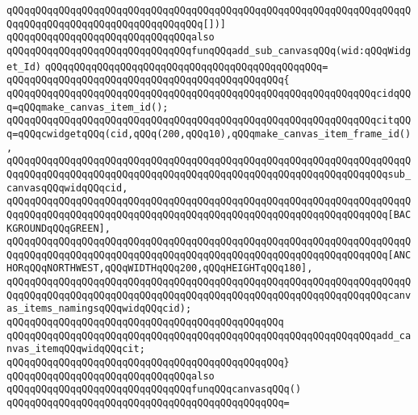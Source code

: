 \verb|qQQqqQQqqQQqqQQqqQQqqQQqqQQqqQQqqQQqqQQqqQQqqQQqqQQqqQQqqQQqqQQqqQQqqQQqqQQqqQQqqQQqqQQqqQQqqQQqqQQqqQQq[])]|\newline
\newline
\verb|qQQqqQQqqQQqqQQqqQQqqQQqqQQqqQQqalso|\newline
\verb|qQQqqQQqqQQqqQQqqQQqqQQqqQQqqQQqfunqQQqadd_sub_canvasqQQq(wid:qQQqWidget_Id)|\newline
\verb|qQQqqQQqqQQqqQQqqQQqqQQqqQQqqQQqqQQqqQQqqQQqqQQq=|\newline
\verb|qQQqqQQqqQQqqQQqqQQqqQQqqQQqqQQqqQQqqQQqqQQqqQQq{|\newline
\verb|qQQqqQQqqQQqqQQqqQQqqQQqqQQqqQQqqQQqqQQqqQQqqQQqqQQqqQQqqQQqqQQqcidqQQq=qQQqmake_canvas_item_id();|\newline
\verb|qQQqqQQqqQQqqQQqqQQqqQQqqQQqqQQqqQQqqQQqqQQqqQQqqQQqqQQqqQQqqQQqcitqQQq=qQQqcwidgetqQQq(cid,qQQq(200,qQQq10),qQQqmake_canvas_item_frame_id(),|\newline
\verb|qQQqqQQqqQQqqQQqqQQqqQQqqQQqqQQqqQQqqQQqqQQqqQQqqQQqqQQqqQQqqQQqqQQqqQQqqQQqqQQqqQQqqQQqqQQqqQQqqQQqqQQqqQQqqQQqqQQqqQQqqQQqqQQqqQQqqQQqsub_canvasqQQqwidqQQqcid,|\newline
\verb|qQQqqQQqqQQqqQQqqQQqqQQqqQQqqQQqqQQqqQQqqQQqqQQqqQQqqQQqqQQqqQQqqQQqqQQqqQQqqQQqqQQqqQQqqQQqqQQqqQQqqQQqqQQqqQQqqQQqqQQqqQQqqQQqqQQqqQQq[BACKGROUNDqQQqGREEN],|\newline
\verb|qQQqqQQqqQQqqQQqqQQqqQQqqQQqqQQqqQQqqQQqqQQqqQQqqQQqqQQqqQQqqQQqqQQqqQQqqQQqqQQqqQQqqQQqqQQqqQQqqQQqqQQqqQQqqQQqqQQqqQQqqQQqqQQqqQQqqQQq[ANCHORqQQqNORTHWEST,qQQqWIDTHqQQq200,qQQqHEIGHTqQQq180],|\newline
\verb|qQQqqQQqqQQqqQQqqQQqqQQqqQQqqQQqqQQqqQQqqQQqqQQqqQQqqQQqqQQqqQQqqQQqqQQqqQQqqQQqqQQqqQQqqQQqqQQqqQQqqQQqqQQqqQQqqQQqqQQqqQQqqQQqqQQqqQQqcanvas_items_namingsqQQqwidqQQqcid);|\newline
\verb|qQQqqQQqqQQqqQQqqQQqqQQqqQQqqQQqqQQqqQQqqQQqqQQq|\newline
\verb|qQQqqQQqqQQqqQQqqQQqqQQqqQQqqQQqqQQqqQQqqQQqqQQqqQQqqQQqqQQqqQQqadd_canvas_itemqQQqwidqQQqcit;|\newline
\verb|qQQqqQQqqQQqqQQqqQQqqQQqqQQqqQQqqQQqqQQqqQQqqQQq}|\newline
\newline
\newline
\verb|qQQqqQQqqQQqqQQqqQQqqQQqqQQqqQQqalso|\newline
\verb|qQQqqQQqqQQqqQQqqQQqqQQqqQQqqQQqfunqQQqcanvasqQQq()|\newline
\verb|qQQqqQQqqQQqqQQqqQQqqQQqqQQqqQQqqQQqqQQqqQQqqQQq=|\newline
